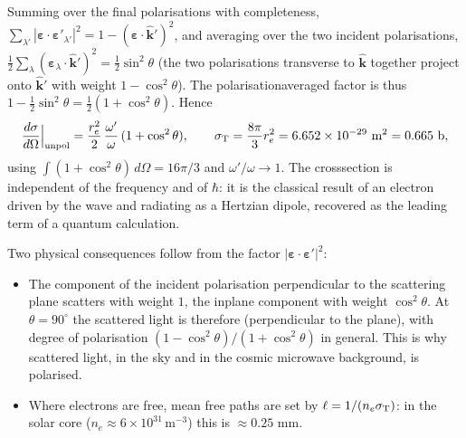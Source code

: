 \documentclass[letterpaper,10pt,english]{jupyterBook}
\begin{document}
\sphinxAtStartPar
{} Summing over the final polarisations with completeness, \(\sum_{\lambda'}|\boldsymbol\varepsilon\!\cdot\!\boldsymbol\varepsilon'_{\lambda'}|^2=1-(\boldsymbol\varepsilon\!\cdot\!\hat{\mathbf k}')^2\), and averaging over the two incident polarisations, \(\tfrac12\sum_\lambda(\boldsymbol\varepsilon_\lambda\!\cdot\!\hat{\mathbf k}')^2=\tfrac12\sin^2\theta\) (the two polarisations transverse to \(\hat{\mathbf k}\) together project onto \(\hat{\mathbf k}'\) with weight \(1-\cos^2\theta\)). The polarisation\sphinxhyphen{}averaged factor is thus \(1-\tfrac12\sin^2\theta=\tfrac12(1+\cos^2\theta)\). Hence
\begin{equation*}
\begin{split}
\frac{d\sigma}{d\Omega}\Big|_{\rm unpol}=\frac{r_e^2}{2}\,\frac{\omega'}{\omega}\,(1+\cos^2\theta),\qquad
\sigma_{\rm T}=\frac{8\pi}{3}r_e^2=6.652\times10^{-29}\ \text{m}^2=0.665\ \text{b},
\end{split}
\end{equation*}
\sphinxAtStartPar
using \(\int(1+\cos^2\theta)\,d\Omega=16\pi/3\) and \(\omega'/\omega\to1\). The cross\sphinxhyphen{}section is independent of the frequency and of \(\hbar\): it is the classical result of an electron driven by the wave and radiating as a Hertzian dipole, recovered as the leading term of a quantum calculation.

\sphinxAtStartPar
Two physical consequences follow from the factor \(|\boldsymbol\varepsilon\!\cdot\!\boldsymbol\varepsilon'|^2\):
\begin{itemize}
\item {} 
\sphinxAtStartPar
The component of the incident polarisation perpendicular to the scattering plane scatters with weight \(1\), the in\sphinxhyphen{}plane component with weight \(\cos^2\theta\). At \(\theta=90^\circ\) the scattered light is therefore  (perpendicular to the plane), with degree of polarisation \((1-\cos^2\theta)/(1+\cos^2\theta)\) in general. This is why scattered light, in the sky and in the cosmic microwave background, is polarised.

\item {} 
\sphinxAtStartPar
Where electrons are free, mean free paths are set by \(\ell=1/(n_e\sigma_{\rm T})\): in the solar core (\(n_e\approx6\times10^{31}\,\text{m}^{-3}\)) this is \(\approx0.25\) mm.

\end{itemize}
\end{document}

